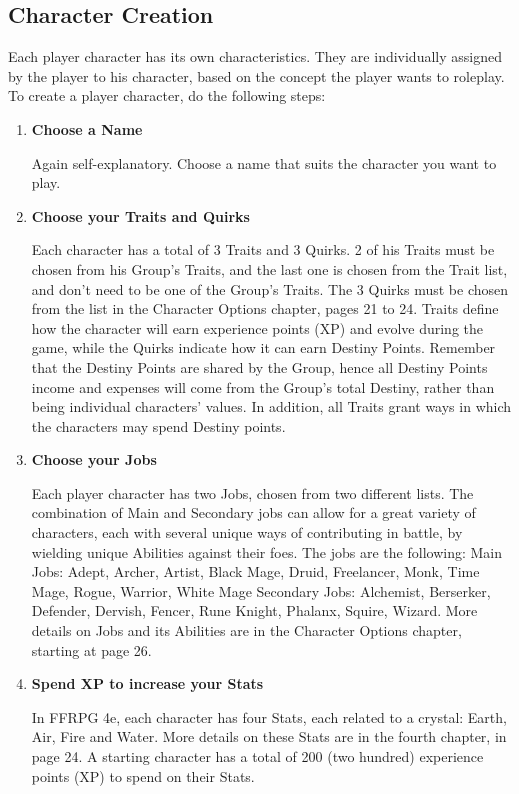 \begin{multicols}{2}
\section{Character Creation}
Each player character has its own
characteristics. They are individually assigned by
the player to his character, based on the concept
the player wants to roleplay. To create a player
character, do the following steps:
\begin{enumerate}
\item \textbf{Choose a Name}

Again self-explanatory. Choose a name that
suits the character you want to play.

\item \textbf{Choose your Traits and Quirks}

Each character has a total of 3 Traits and 3
Quirks. 2 of his Traits must be chosen from his
Group’s Traits, and the last one is chosen from the
Trait list, and don’t need to be one of the Group's
Traits. The 3 Quirks must be chosen from the list
in the Character Options chapter, pages 21 to 24.
Traits define how the character will earn
experience points (XP) and evolve during the game,
while the Quirks indicate how it can earn Destiny
Points. Remember that the Destiny Points are
shared by the Group, hence all Destiny Points
income and expenses will come from the Group's
total Destiny, rather than being individual
characters’ values. In addition, all Traits grant
ways in which the characters may spend Destiny
points.

\item \textbf{Choose your Jobs}

Each player character has two Jobs, chosen
from two different lists. The combination of Main
and Secondary jobs can allow for a great variety of
characters, each with several unique ways of
contributing in battle, by wielding unique Abilities
against their foes. The jobs are the following:
Main Jobs: Adept, Archer, Artist, Black Mage,
Druid, Freelancer, Monk, Time Mage, Rogue,
Warrior, White Mage
Secondary Jobs: Alchemist, Berserker, Defender,
Dervish, Fencer, Rune Knight, Phalanx, Squire,
Wizard.
More details on Jobs and its Abilities are in the
Character Options chapter, starting at page 26.

\item \textbf{Spend XP to increase your Stats}

In FFRPG 4e, each character has four Stats,
each related to a crystal: Earth, Air, Fire and Water.
More details on these Stats are in the fourth
chapter, in page 24. A starting character has a total
of 200 (two hundred) experience points (XP) to
spend on their Stats.


\end{enumerate}
\end{multicols}
